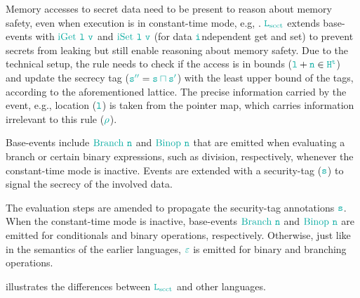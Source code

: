 \documentclass[acmsmall]{acmart}
\theoremstyle{definition}
\begin{document}
Memory accesses to secret data need to be present to reason about memory safety, even when execution is in constant-time mode, e.g, .
$\Lscct$ extends base-events with $\obj{\ev{iGet}\ \loc\ \valueexpr}$ and $\obj{\ev{iSet}\ \loc\ \valueexpr}$ (for data $\obj{i}$ndependent get and set) to prevent secrets from leaking but still enable reasoning about memory safety. 
Due to the technical setup, the rule needs to check if the access is in bounds ($\obj{\loc}+\obj{n}\in\obj{H^t}$) and update the secrecy tag ($\obj{\securitytag{''}}=\obj{\securitytag{}\sqcap\securitytag{'}}$) with the least upper bound of the tags, according to the aforementioned lattice.
The precise information carried by the event, e.g., location ($\obj{\loc}$) is taken from the pointer map, which carries information irrelevant to this rule ($\obj{\poison}$).

Base-events include $\obj{\ev{Branch}\ n}$ and $\obj{\ev{Binop}\ n}$ that are emitted when evaluating a branch or certain binary expressions, such as division, respectively, whenever the constant-time mode is inactive.
Events are extended with a security-tag ($\obj{\securitytag{}}$) to signal the secrecy of the involved data.

The evaluation steps are amended to propagate the security-tag annotations $\obj{\securitytag{}}$.
When the constant-time mode is inactive, base-events $\obj{\ev{Branch}\ n}$ and $\obj{\ev{Binop}\ n}$ are emitted for conditionals and binary operations, respectively.
Otherwise, just like in the semantics of the earlier languages, $\obj{\emptyevent}$ is emitted for binary and branching operations.


 illustrates the differences between $\Lscct$ and other languages.
\end{document}
